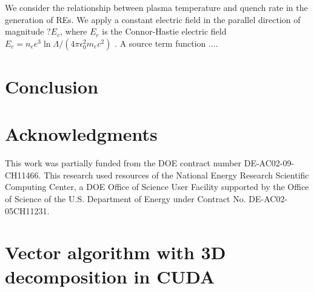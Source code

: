 \documentclass[12pt]{siamart}
\begin{document}
We consider the relationship between plasma temperature and quench rate in the generation of REs.
We apply a constant electric field in the parallel direction of magnitude $? E_c$, where $E_c$ is the Connor-Hastie electric field $E_c =n_e e^3\ln \Lambda / \left (4 \pi \epsilon_0^2 m_e c^2\right)$ \cite{Connor1975}.
A source term function ....

\section{Conclusion}

\section{Acknowledgments}

 This work was partially funded from the DOE contract number
DE-AC02-09-CH11466.  This research used resources of the National
Energy Research Scientific Computing Center, a DOE Office of Science
User Facility supported by the Office of Science of the
U.S. Department of Energy under Contract No. DE-AC02-05CH11231.

\appendix
\section{Vector algorithm with 3D decomposition in CUDA}
\label{app:algo3d}
\end{document}
